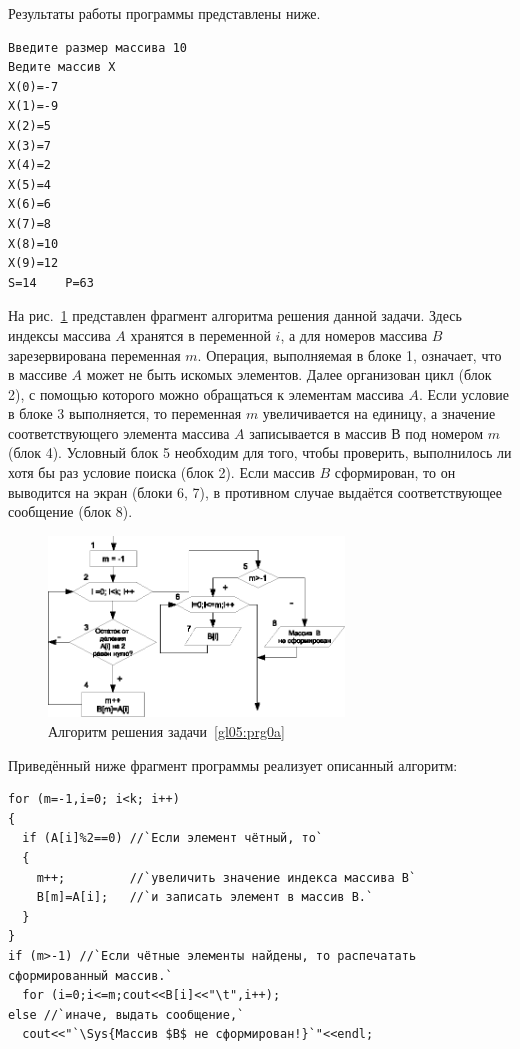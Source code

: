 Результаты работы программы представлены ниже.
\begin{verbatim}
Введите размер массива 10 
Ведите массив Х 
X(0)=-7 
X(1)=-9 
X(2)=5 
X(3)=7 
X(4)=2 
X(5)=4 
X(6)=6 
X(7)=8 
X(8)=10 
X(9)=12 
S=14	P=63 
\end{verbatim}


На рис.~\ref{ch05:refDrawing6a} представлен фрагмент алгоритма решения данной задачи. 
Здесь индексы массива $A$ хранятся в переменной $i$, а для номеров массива $B$ 
зарезервирована переменная $m$. Операция, выполняемая в блоке 1, означает, 
что в массиве $A$ может не быть искомых элементов. Далее организован цикл (блок 2), 
с помощью которого можно обращаться к элементам массива $A$. Если условие в блоке 3 
выполняется, то переменная $m$ увеличивается на единицу, а значение соответствующего 
элемента массива $A$ записывается в массив В под номером $m$ (блок 4). Условный блок 5 
необходим для того, чтобы проверить, выполнилось ли хотя бы раз условие поиска (блок 2). 
Если массив $B$ сформирован, то он выводится на экран (блоки 6, 7), в противном случае 
выдаётся соответствующее сообщение (блок 8).

\begin{figure}[h]
\begin{center}
\includegraphics[width=0.7\textwidth]{img/ris_5_7a}
\caption{Алгоритм решения задачи~\ref{gl05:prg0a}}
\label{ch05:refDrawing6a}
\end{center}
\end{figure}

Приведённый ниже фрагмент программы реализует описанный алгоритм:
\begin{lstlisting}
for (m=-1,i=0; i<k; i++)
{
  if (A[i]%2==0) //`Если элемент чётный, то`
  {
    m++;         //`увеличить значение индекса массива В` 
    B[m]=A[i];   //`и записать элемент в массив В.`
  }
}
if (m>-1) //`Если чётные элементы найдены, то распечатать сформированный массив.`
  for (i=0;i<=m;cout<<B[i]<<"\t",i++);
else //`иначе, выдать сообщение,`
  cout<<"`\Sys{Массив $B$ не сформирован!}`"<<endl; 
\end{lstlisting}

